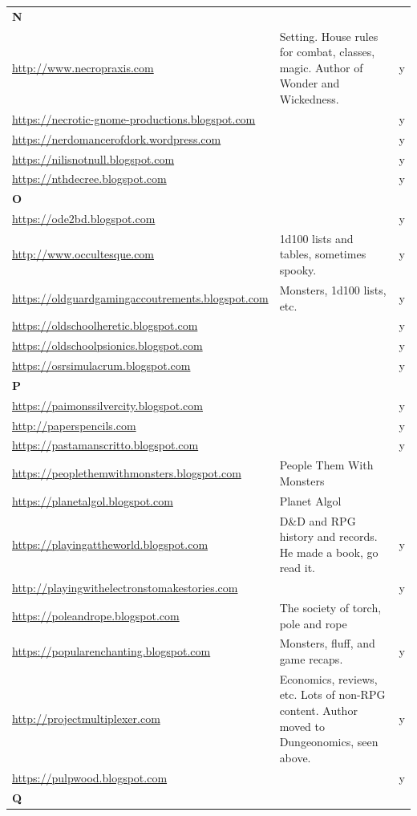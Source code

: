 \documentclass[a4paper, 11pt, twoside]{article}
\begin{document}
\begin{longtable}{p{6cm}p{8cm}c}
\textbf{N} &  & \\
\url{http://www.necropraxis.com} & Setting. House rules for combat, classes, magic. Author of Wonder and Wickedness. & y\\
\url{https://necrotic-gnome-productions.blogspot.com} &  & y\\
\url{https://nerdomancerofdork.wordpress.com} &  & y\\
\url{https://nilisnotnull.blogspot.com} &  & y\\
\url{https://nthdecree.blogspot.com} &  & y\\
\textbf{O} &  & \\
\url{https://ode2bd.blogspot.com} &  & y\\
\url{http://www.occultesque.com} & 1d100 lists and tables, sometimes spooky. & y\\
\url{https://oldguardgamingaccoutrements.blogspot.com} & Monsters, 1d100 lists, etc. & y\\
\url{https://oldschoolheretic.blogspot.com} &  & y\\
\url{https://oldschoolpsionics.blogspot.com} &  & y\\
\url{https://osrsimulacrum.blogspot.com} &  & y\\
\textbf{P} &  & \\
\url{https://paimonssilvercity.blogspot.com} &  & y\\
\url{http://paperspencils.com} &  & y\\
\url{https://pastamanscritto.blogspot.com} &  & y\\
\url{https://peoplethemwithmonsters.blogspot.com} & People Them With Monsters & \\
\url{https://planetalgol.blogspot.com} & Planet Algol & \\
\url{https://playingattheworld.blogspot.com} & D\&D and RPG history and records. He made a book, go read it. & y\\
\url{http://playingwithelectronstomakestories.com} &  & y\\
\url{https://poleandrope.blogspot.com} & The society of torch, pole and rope & \\
\url{https://popularenchanting.blogspot.com} & Monsters, fluff, and game recaps. & y\\
\url{http://projectmultiplexer.com} & Economics, reviews, etc. Lots of non-RPG content. Author moved to Dungeonomics, seen above. & y\\
\url{https://pulpwood.blogspot.com} &  & y\\
\textbf{Q} &  & \\

\end{longtable}
\end{document}
